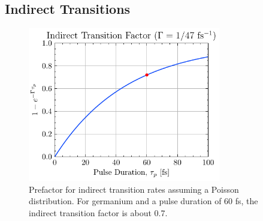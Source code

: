 \subsection{Indirect Transitions}
\label{sec:indirect_transitions}

\begin{figure}
	\centering
	\includegraphics[width=0.75\textwidth]{figures/chap4/Indirect_transition_factor.pdf}
	\caption{Prefactor for indirect transition rates assuming a Poisson distribution. For germanium and a pulse duration of 60 fs, the indirect transition factor is about 0.7.}
	\label{fig:Indirect_transition_factor}
\end{figure}


